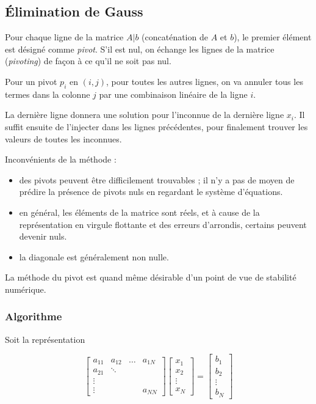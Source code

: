 	\subsection{Élimination de Gauss}
	
	Pour chaque ligne de la matrice $A \vert b$ (concaténation de $A$ et $b$), le premier élément est désigné comme \textit{pivot}. S'il est nul, on échange les lignes de la matrice (\textit{pivoting}) de façon à ce qu'il ne soit pas nul.
	
	Pour un pivot $p_i$ en $(i, j)$, pour toutes les autres lignes, on va annuler tous les termes dans la colonne $j$ par une combinaison linéaire de la ligne $i$.
	
	La dernière ligne donnera une solution pour l'inconnue de la dernière ligne $x_{i}$. Il suffit ensuite de l'injecter dans les lignes précédentes, pour finalement trouver les valeurs de toutes les inconnues.
	
	Inconvénients de la méthode :
	
	\begin{itemize}
		\item  des pivots peuvent être difficilement trouvables ; il n'y a pas de moyen de prédire la présence de pivots nuls en regardant le système d'équations.
		
		\item en général, les éléments de la matrice sont réels, et à cause de la représentation en virgule flottante et des erreurs d'arrondis, certains peuvent devenir nuls.
		
		\item la diagonale est généralement non nulle.
	\end{itemize}
	
	La méthode du pivot est quand même désirable d'un point de vue de stabilité numérique.
	
		\subsubsection{Algorithme}
		
		Soit la représentation
		
		$$\begin{bmatrix}
a_{11} & a_{12} & \dots & a_{1N} \\ 
a_{21} & \ddots &   &  \\ 
\vdots &  &  &  \\ 
\vdots &  &  & a_{NN}
\end{bmatrix} \begin{bmatrix}
x_1 \\ 
x_2 \\ 
\vdots \\ 
x_N
\end{bmatrix} = \begin{bmatrix}
b_1 \\ 
b_2 \\ 
\vdots \\ 
b_N
\end{bmatrix}  $$
		

